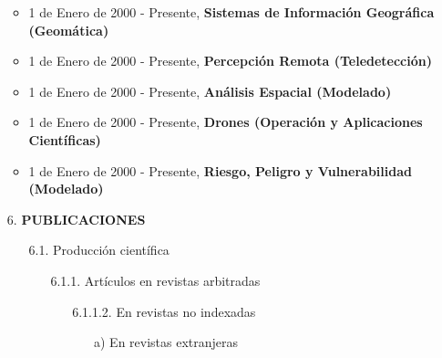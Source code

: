 \documentclass[12pt]{report}
\begin{document}
\begin{enumerate}
\begin{itemize}
                            \item{ 1 de Enero de 2000 - Presente,\textbf{ Sistemas de Información Geográfica (Geomática) } }

                            \item{ 1 de Enero de 2000 - Presente,\textbf{ Percepción Remota (Teledetección) } }

                            \item{ 1 de Enero de 2000 - Presente,\textbf{ Análisis Espacial (Modelado) } }

                            \item{ 1 de Enero de 2000 - Presente,\textbf{ Drones (Operación y Aplicaciones Científicas) } }

                            \item{ 1 de Enero de 2000 - Presente,\textbf{ Riesgo, Peligro y Vulnerabilidad (Modelado) } }

                    \end{itemize}







            \vspace{0.5cm}
            \item[6.] \textbf{PUBLICACIONES}
                \begin{enumerate}

                        \item[6.1.] Producción científica
                            \begin{enumerate}

                                    \item[6.1.1.] Artículos en revistas arbitradas
                                        \begin{enumerate}



                                                \item[6.1.1.2.] En revistas no indexadas
                                                    \begin{itemize}


                                                            \item[a)] En revistas extranjeras
                                                                \begin{itemize}


\end{itemize}
\end{itemize}
\end{enumerate}
\end{enumerate}
\end{enumerate}
\end{enumerate}
\end{document}
